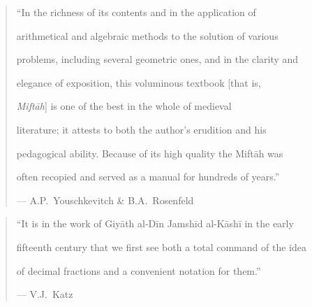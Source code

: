 \documentclass[11pt,a4paper]{article}
\begin{document}
\begin{quote}

``In the richness of its contents and in the application of

arithmetical and algebraic methods to the solution of various

problems, including several geometric ones, and in the clarity and

elegance of exposition, this voluminous textbook [that is,

\textit{Mift\=ah}] is one of the best in the whole of medieval

literature; it attests to both the author's erudition and his

pedagogical ability. Because of its high quality the Mift\=ah was

often recopied and served as a manual for hundreds of years.''

\begin{flushright}

--- A.P.\ Youschkevitch \& B.A.\ Rosenfeld

\end{flushright}

\end{quote}



\vspace{0.3cm}



\begin{quote}

``It is in the work of Giy\=ath al-D\=in Jamsh\=id al-K\=ash\=i in the early

fifteenth century that we first see both a total command of the idea

of decimal fractions and a convenient notation for them.''

\begin{flushright}

--- V.J.\ Katz

\end{flushright}

\end{quote}



\vspace{0.3cm}
\end{document}
